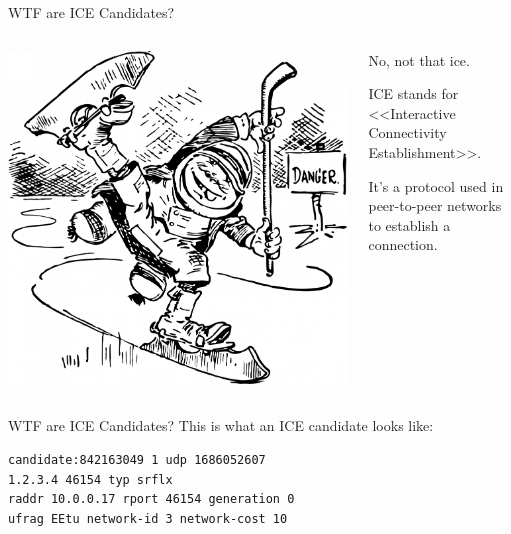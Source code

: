 \documentclass[aspectratio=1610,14pt,t]{beamer}
\begin{document}
\begin{frame}[c]{WTF are ICE Candidates?}
  \begin{columns}[T]
    \begin{column}{.3\textwidth}
      \includegraphics[width=\textwidth]{img/ice-skater.jpg}
    \end{column}
    \begin{column}{.7\textwidth}
      No, not that ice.

      \vspace{1em}

      \pause
      ICE stands for <<Interactive Connectivity Establishment>>.

      \vspace{1em}

      It's a protocol used in peer-to-peer networks to establish a connection.
    \end{column}
  \end{columns}
\end{frame}

\begin{frame}[c,fragile]{WTF are ICE Candidates?}
  This is what an ICE candidate looks like:

  \begin{verbatim}
candidate:842163049 1 udp 1686052607
1.2.3.4 46154 typ srflx
raddr 10.0.0.17 rport 46154 generation 0
ufrag EEtu network-id 3 network-cost 10
  \end{verbatim}
\end{frame}
\end{document}
